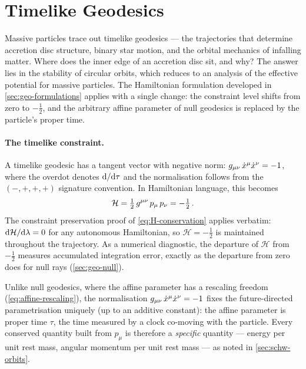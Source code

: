 \section{Timelike Geodesics}
\label{sec:geo-timelike}

Massive particles trace out timelike geodesics --- the trajectories
that determine accretion disc structure, binary star motion, and the
orbital mechanics of infalling matter.  Where does the inner edge
of an accretion disc sit, and why?  The answer lies in the stability
of circular orbits, which reduces to an analysis of the effective
potential for massive particles.  The Hamiltonian formulation
developed in \cref{sec:geo-formulations} applies with a single
change: the constraint level shifts from zero to $-\tfrac{1}{2}$,
and the arbitrary affine parameter of null geodesics is replaced by
the particle's proper time.

\paragraph{The timelike constraint.}

A timelike geodesic has a tangent vector with negative norm:
$g_{\mu\nu}\,\dot{x}^\mu\dot{x}^\nu = -1$, where the overdot
denotes $\mathrm{d}/\mathrm{d}\tau$ and the normalisation follows from the
$(-,+,+,+)$ signature convention.  In Hamiltonian language, this
becomes
%
\begin{equation}
  \mathcal{H} = \tfrac{1}{2}\,g^{\mu\nu}\,p_\mu\,p_\nu
  = -\tfrac{1}{2} \,.
  \label{eq:timelike-constraint}
\end{equation}
%
The constraint preservation proof of \cref{eq:H-conservation}
applies verbatim: $\mathrm{d}\mathcal{H}/\mathrm{d}\lambda = 0$ for any autonomous
Hamiltonian, so $\mathcal{H} = -\tfrac{1}{2}$ is maintained
throughout the trajectory.  As a numerical diagnostic, the departure
of $\mathcal{H}$ from $-\tfrac{1}{2}$ measures accumulated
integration error, exactly as the departure from zero does for null
rays (\cref{sec:geo-null}).

Unlike null geodesics, where the affine parameter has a rescaling
freedom (\cref{eq:affine-rescaling}), the normalisation
$g_{\mu\nu}\,\dot{x}^\mu\dot{x}^\nu = -1$ fixes the future-directed
parametrisation uniquely (up to an additive constant): the affine
parameter is proper time $\tau$, the time measured by a clock
co-moving with the particle.  Every conserved quantity built from
$p_\mu$ is therefore a \emph{specific} quantity --- energy per unit
rest mass, angular momentum per unit rest mass --- as noted in
\cref{sec:schw-orbits}.

